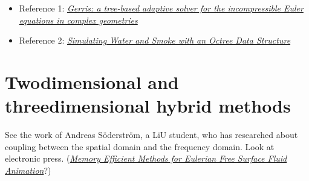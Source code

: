 \begin{itemize}
    \item Reference 1: \textit{\href{http://gfs.sourceforge.net/gerris.pdf}{Gerris: a tree-based adaptive solver for the incompressible Euler equations in complex geometries}}
    \item Reference 2: \textit{\href{http://physbam.stanford.edu/~fedkiw/papers/stanford2004-02.pdf}{Simulating Water and Smoke with an Octree Data Structure}}
\end{itemize}

\section{Twodimensional and threedimensional hybrid methods}

See the work of Andreas Söderström, a LiU student, who has researched about coupling between the spatial domain and the frequency domain. Look at electronic press. (\textit{\href{http://liu.diva-portal.org/smash/get/diva2:359805/FULLTEXT01}{Memory Efficient Methods for Eulerian Free Surface Fluid Animation}}?)